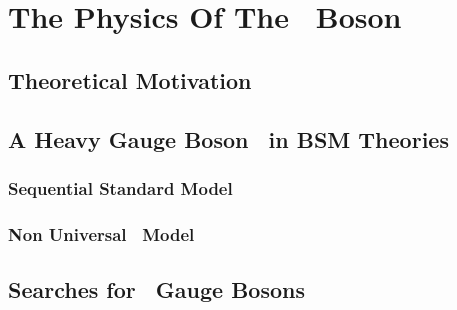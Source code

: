 \chapter[The Physics Of The \Zprime~Boson]{The Physics Of The \Zprime~Boson}
\label{chap:Zp}

\section{Theoretical Motivation}
\label{sec:Motivation}

\section{A Heavy Gauge Boson \Zprime~in BSM Theories}
\label{sec:Models}

\subsection{Sequential Standard Model}
\label{subsec:SSM}

\subsection{Non Universal \Zprime~Model}
\label{subsec:Models}

\section{Searches for \Zprime~Gauge Bosons}
\label{sec:Models}



